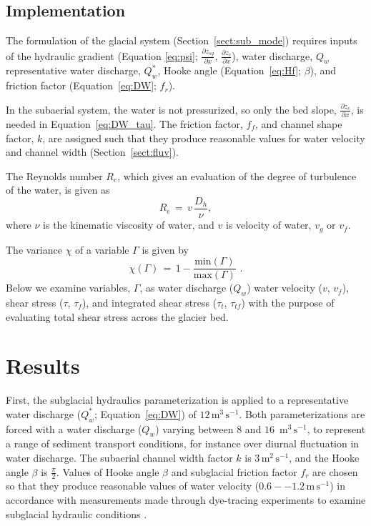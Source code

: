 \documentclass[11pt]{article}
\newcommand{\unit}[1]{$\mathrm{#1}$}
\begin{document}
\begin{spacing}{1}
  \subsection{Implementation}
  
  The formulation of the glacial system (Section~\ref{sect:sub_mode}) requires inputs of the hydraulic gradient (Equation \ref{eq:psi}; $\frac{\partial z_{sg}}{\partial x}$, $\frac{\partial z_{c}}{\partial x}$), water discharge, $Q_w$ representative water discharge, $Q_w^*$,  Hooke angle (Equation~\ref{eq:Hf}; $\beta$), and friction factor (Equation~\ref{eq:DW}; $f_r$).

  
  In the subaerial system, the water is not pressurized, so only the bed slope, $\frac{\partial z_c}{\partial x}$, is needed in Equation~\ref{eq:DW_tau}. The friction factor, $f_f$, and channel shape factor, $k$, are assigned such that they produce reasonable values for water velocity and channel width  (Section~\ref{sect:fluv}).
  
  The Reynolds number $R_e$, which gives an evaluation of the degree of turbulence of the water, is given as 
  \begin{equation}
    \label{eq:re}
    R_e\,=\, v \,\frac{D_h}{\nu},
  \end{equation}
  \noindent where $\nu$ is the kinematic viscosity of water, and  $v$ is velocity of water, $v_g$ or $v_f$.
  
  The variance $ \chi$ of a variable $\Gamma$ is given by 
  \begin{equation}
    \label{eq:var}
    \chi(\Gamma) \,=\, 1 - \frac{\mathrm{min}(\Gamma)}{\mathrm{max}(\Gamma)}\,\,.
  \end{equation}
  \noindent Below we examine variables, $\Gamma$, as water discharge ($Q_w$) water velocity ($v$, $v_f$), shear stress ($\tau$, $\tau_f$), and integrated shear stress ($\tau_t$, $\tau_{tf}$) with the purpose of evaluating total shear stress across the glacier bed.
  
  
  \section{Results}
  First, the subglacial hydraulics parameterization is applied to a representative water discharge ($Q_w^*$; Equation~\ref{eq:DW}) of $12$\,\unit{m}$^{3}$\,\unit{s}$^{-1}$.
  Both parameterizations are forced with a water discharge ($Q_w$) varying between $8$ and $16$ \,\unit{m}$^{3}$\,\unit{s}$^{-1}$, to represent a range of sediment transport conditions, for instance over diurnal fluctuation in water discharge. The subaerial channel width factor $k$ is $3$\,\unit{m}$^{2}$\,\unit{s}$^{-1}$, and the Hooke angle $\beta$ is $\frac{\pi}{2}$.
  Values of Hooke angle $\beta$ and subglacial friction factor $f_r$ are chosen so that they produce reasonable values of water velocity ($0.6-- 1.2$\,\unit{m}\,\unit{s}$^{-1}$) in accordance with measurements made through dye-tracing experiments to examine subglacial hydraulic conditions \citep[Section~\ref{sect:sub_mode}, Figure~\ref{fig:model_outs}; e.g.][]{werder2010}.
  

\end{spacing}
\end{document}
